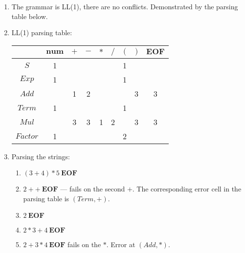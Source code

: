 \begin{exercise}{}
\begin{solution}
\begin{enumerate}
\begin{enumerate}
        \end{enumerate}
      \item The grammar is LL(1), there are no conflicts. Demonstrated by the
      parsing table below.
      \item LL(1) parsing table:
        \begin{center}
          \begin{tabular}{c|c|c|c|c|c|c|c|c}
            & \(\mathbf{num}\) & \(+\) & \(-\) & \(*\) & \(/\) & \((\) & \()\) & \(\mathbf{EOF}\) \\
            \hline
            \(S\) & 1 & & & & & 1 & &\\
            \(Exp\) & 1 & & & & & 1 & &\\
            \(Add\) & & 1 & 2 & & & & 3 & 3 \\
            \(Term\) & 1 & & & & & 1 & & \\
            \(Mul\) & & 3 & 3 & 1 & 2 & & 3 & 3 \\
            \(Factor\) & 1 & & & & & 2 & & \\
          \end{tabular}
        \end{center}
      \item Parsing the strings:
      \begin{enumerate}
        \item \((3 + 4) * 5 ~\mathbf{EOF}\) \checkmark
        \item \(2 + + ~\mathbf{EOF}\) --- fails on the second \(+\). The
        corresponding error cell in the parsing table is \((Term, +)\).
        \item \(2 ~\mathbf{EOF}\) \checkmark
        \item \(2 * 3 + 4 ~\mathbf{EOF}\) \checkmark
        \item \(2 + 3 * 4 ~\mathbf{EOF}\) fails on the \(*\). Error at \((Add, *)\).
      \end{enumerate}


\end{enumerate}
\end{solution}
\end{exercise}
